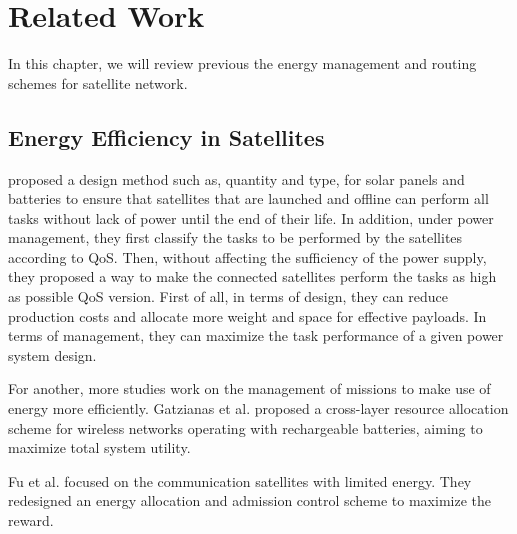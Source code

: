 \section{Related Work}

In this chapter, we will review previous the energy management and routing schemes for satellite network. 


\label{PRC}

\subsection{Energy Efficiency in Satellites}
\cite{BATTERYTYPE} proposed a design method such as, quantity and type, for solar panels and batteries to ensure that satellites that are launched and offline can perform all tasks without lack of power until the end of their life. In addition, under power management, they first classify the tasks to be performed by the satellites according to QoS. Then, without affecting the sufficiency of the power supply, they proposed a way to make the connected satellites perform the tasks as high as possible QoS version. First of all, in terms of design, they can reduce production costs and allocate more weight and space for effective payloads. In terms of management, they can maximize the task performance of a given power system design.

For another, more studies work on the management of missions to make use of energy more efficiently. Gatzianas et al. \cite{CROSSLAYER} proposed a cross-layer resource allocation scheme for wireless networks operating with rechargeable batteries, aiming to maximize total system utility.

Fu et al. \cite{ADMISSIONCONTROL} focused on the communication satellites with limited energy. They redesigned an energy allocation and admission control scheme to maximize the reward. 

